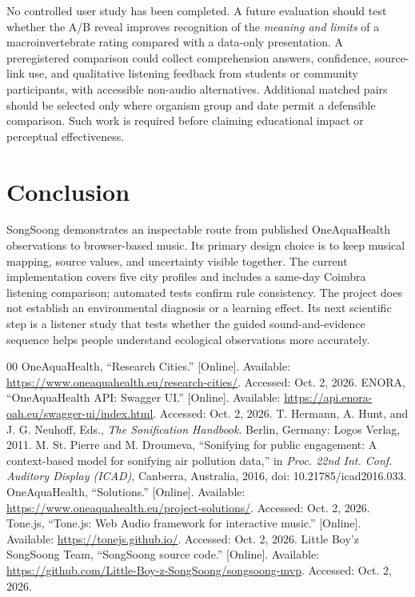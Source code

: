 \documentclass[conference]{IEEEtran}
\begin{document}
No controlled user study has been completed. A future evaluation should test whether the A/B reveal improves recognition of the \emph{meaning and limits} of a macroinvertebrate rating compared with a data-only presentation. A preregistered comparison could collect comprehension answers, confidence, source-link use, and qualitative listening feedback from students or community participants, with accessible non-audio alternatives. Additional matched pairs should be selected only where organism group and date permit a defensible comparison. Such work is required before claiming educational impact or perceptual effectiveness.

\section{Conclusion}
SongSoong demonstrates an inspectable route from published OneAquaHealth observations to browser-based music. Its primary design choice is to keep musical mapping, source values, and uncertainty visible together. The current implementation covers five city profiles and includes a same-day Coimbra listening comparison; automated tests confirm rule consistency. The project does not establish an environmental diagnosis or a learning effect. Its next scientific step is a listener study that tests whether the guided sound-and-evidence sequence helps people understand ecological observations more accurately.

\balance
\begin{thebibliography}{00}
 OneAquaHealth, ``Research Cities.'' [Online]. Available: \url{https://www.oneaquahealth.eu/research-cities/}. Accessed: Oct. 2, 2026.
 ENORA, ``OneAquaHealth API: Swagger UI.'' [Online]. Available: \url{https://api.enora-oah.eu/swagger-ui/index.html}. Accessed: Oct. 2, 2026.
 T. Hermann, A. Hunt, and J. G. Neuhoff, Eds., \emph{The Sonification Handbook}. Berlin, Germany: Logos Verlag, 2011.
 M. St. Pierre and M. Droumeva, ``Sonifying for public engagement: A context-based model for sonifying air pollution data,'' in \emph{Proc. 22nd Int. Conf. Auditory Display (ICAD)}, Canberra, Australia, 2016, doi: 10.21785/icad2016.033.
 OneAquaHealth, ``Solutions.'' [Online]. Available: \url{https://www.oneaquahealth.eu/project-solutions/}. Accessed: Oct. 2, 2026.
 Tone.js, ``Tone.js: Web Audio framework for interactive music.'' [Online]. Available: \url{https://tonejs.github.io/}. Accessed: Oct. 2, 2026.
 Little Boy'z SongSoong Team, ``SongSoong source code.'' [Online]. Available: \url{https://github.com/Little-Boy-z-SongSoong/songsoong-mvp}. Accessed: Oct. 2, 2026.
\end{thebibliography}
\end{document}
